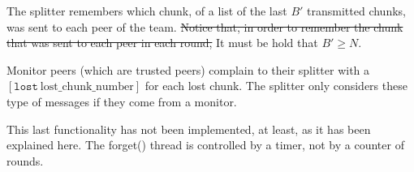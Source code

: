 

\label{sec:free_riding_control}

The splitter remembers which chunk, of a list of the last $B'$
transmitted chunks, was sent to each  peer of the team. \st{Notice that, in
order to remember the chunk that was sent to each peer in each round,}
It must be hold that $B'\ge N$. 

Monitor peers (which are trusted peers) complain to their splitter
with a $[\mathtt{lost}~\text{lost\_chunk\_number}]$ for each lost
chunk. The splitter only considers these type of messages if they come
from a monitor. 


\begin{notex}
This last functionality has not been implemented, at least, as it has
been explained here. The forget() thread is controlled by a timer, not
by a counter of rounds.
\end{notex}

